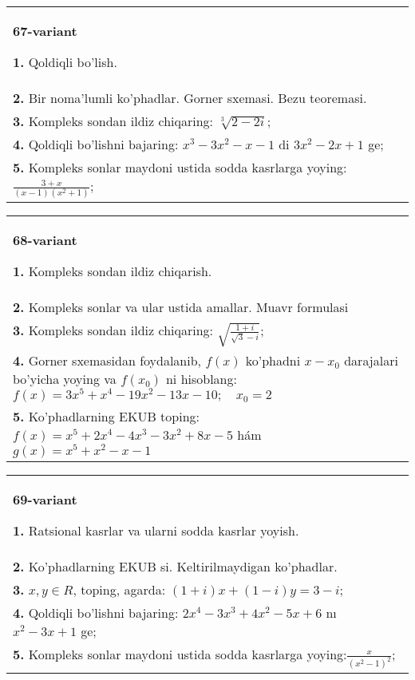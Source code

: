 \documentclass{article}
\begin{document}
\begin{tabular}{m{17cm}}
\textbf{67-variant}
\newline

\textbf{1.} Qoldiqli bo’lish.  \\
\textbf{2.} Bir noma’lumli ko’phadlar. Gorner sxemasi. Bezu teoremasi.  \\
\textbf{3.} Kompleks sondan ildiz chiqaring: $\sqrt[3]{2-2 i}$; \\
\textbf{4.} Qoldiqli bo’lishni bajaring: $x^3-3 x^2-x-1$ di $3 x^2-2 x+1$ ge; \\
\textbf{5.} Kompleks sonlar maydoni ustida sodda kasrlarga yoying:$\frac{3+x}{(x-1)\left(x^2+1\right)}$; \\

\end{tabular}
\vspace{1cm}


\begin{tabular}{m{17cm}}
\textbf{68-variant}
\newline

\textbf{1.} Kompleks sondan ildiz chiqarish. \\
\textbf{2.} Kompleks sonlar va ular ustida amallar. Muavr formulasi  \\
\textbf{3.} Kompleks sondan ildiz chiqaring: $\sqrt{\frac{1+i}{\sqrt{3}-i}}$; \\
\textbf{4.} Gorner sxemasidan foydalanib, $f(x)$ ko’phadni $x-x_0$ darajalari bo’yicha yoying va $f\left(x_0\right)$ ni hisoblang: $f(x)=3 x^5+x^4-19 x^2-13 x-10 ; \quad x_0=2$ \\
\textbf{5.} Ko’phadlarning EKUB toping:  $f(x)=x^5+2 x^4-4 x^3-3 x^2+8 x-5$ hám $g(x)=x^5+x^2-x-1$ \\

\end{tabular}
\vspace{1cm}


\begin{tabular}{m{17cm}}
\textbf{69-variant}
\newline

\textbf{1.} Ratsional kasrlar va ularni sodda kasrlar yoyish. \\
\textbf{2.} Ko’phadlarning EKUB si. Keltirilmaydigan ko’phadlar. \\
\textbf{3.}  $x, y \in R$, toping, agarda:  $(1+i) x+(1-i) y=3-i$; \\
\textbf{4.} Qoldiqli bo’lishni bajaring: $2 x^4-3 x^3+4 x^2-5 x+6$ nı $x^2-3 x+1$ ge; \\
\textbf{5.} Kompleks sonlar maydoni ustida sodda kasrlarga yoying:$\frac{x}{\left(x^2-1\right)^2}$; \\

\end{tabular}
\vspace{1cm}
\end{document}
